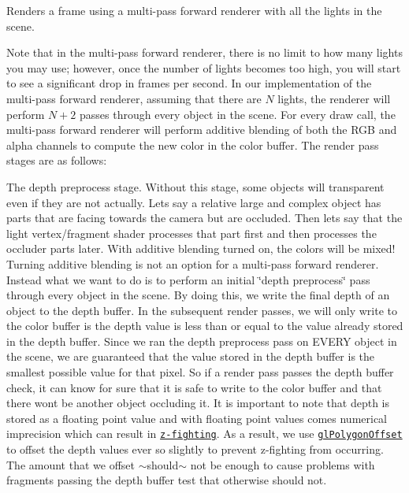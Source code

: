 Renders a frame using a multi-\/pass forward renderer with all the lights in the scene. 

Note that in the multi-\/pass forward renderer, there is no limit to how many lights you may use; however, once the number of lights becomes too high, you will start to see a significant drop in frames per second. In our implementation of the multi-\/pass forward renderer, assuming that there are $N$ lights, the renderer will perform $ N + 2 $ passes through every object in the scene. For every draw call, the multi-\/pass forward renderer will perform additive blending of both the R\+GB and alpha channels to compute the new color in the color buffer. The render pass stages are as follows\+:


\begin{DoxyEnumerate}
\item The depth preprocess stage. Without this stage, some objects will transparent even if they are not actually. Let\textquotesingle{}s say a relative large and complex object has parts that are facing towards the camera but are occluded. Then let\textquotesingle{}s say that the light vertex/fragment shader processes that part first and then processes the occluder parts later. With additive blending turned on, the colors will be mixed! Turning additive blending is not an option for a multi-\/pass forward renderer. Instead what we want to do is to perform an initial \char`\"{}depth preprocess\char`\"{} pass through every object in the scene. By doing this, we write the final depth of an object to the depth buffer. In the subsequent render passes, we will only write to the color buffer is the depth value is less than or equal to the value already stored in the depth buffer. Since we ran the depth preprocess pass on E\+V\+E\+RY object in the scene, we are guaranteed that the value stored in the depth buffer is the smallest possible value for that pixel. So if a render pass passes the depth buffer check, it can know for sure that it is safe to write to the color buffer and that there won\textquotesingle{}t be another object occluding it. It is important to note that depth is stored as a floating point value and with floating point values comes numerical imprecision which can result in \href{https://en.wikipedia.org/wiki/Z-fighting}{\tt z-\/fighting}. As a result, we use \href{https://www.opengl.org/sdk/docs/man/html/glPolygonOffset.xhtml}{\tt gl\+Polygon\+Offset} to offset the depth values ever so slightly to prevent z-\/fighting from occurring. The amount that we offset $\sim$should$\sim$ not be enough to cause problems with fragments passing the depth buffer test that otherwise should not.

\end{DoxyEnumerate}
